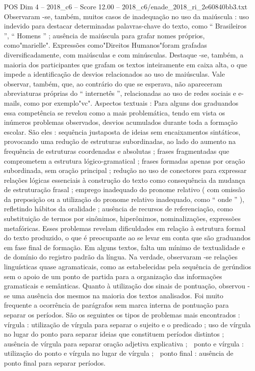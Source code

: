 \begin{textsample}{POS Dim 4 – 2018\_c6 – Score 12.00 – 2018\_c6/enade\_2018\_ri\_2e60840bb3.txt}
Observaram -se, também, muitos casos de inadequação no uso da maiúscula : uso indevido para destacar determinadas palavras-chave do texto, como “ Brasileiros ”, “ Homens ” ; ausência de maiúscula para grafar nomes próprios, como"marielle".
Expressões como"Direitos Humanos"foram grafadas diversificadamente, com maiúsculas e com minúsculas.
Destaque -se, também, a maioria dos participantes que grafam os textos inteiramente em caixa alta, o que impede a identificação de desvios relacionados ao uso de maiúsculas.
Vale observar, também, que, ao contrário do que se esperava, não apareceram abreviaturas próprias do “ internetês ”, relacionadas ao uso de redes sociais e e-mails, como por exemplo"vc".
Aspectos textuais : Para alguns dos graduandos essa competência se revelou como a mais problemática, tendo em vista os inúmeros problemas observados, desvios acumulados durante toda a formação escolar.
São eles : sequência justaposta de ideias sem encaixamentos sintáticos, provocando uma redução de estruturas subordinadas, ao lado do aumento na frequência de estruturas coordenadas e absolutas ; frases fragmentadas que comprometem a estrutura lógico-gramatical ; frases formadas apenas por oração subordinada, sem oração principal ; redução no uso de conectores para expressar relações lógicas essenciais à construção do texto como consequência da mudança de estruturação frasal ; emprego inadequado do pronome relativo ( com omissão da preposição ou a utilização do pronome relativo inadequado, como “ onde ” ), refletindo hábitos da oralidade ; ausência de recursos de referenciação, como substituição de termos por sinônimos, hiperônimos, nominalizações, expressões metafóricas.
Esses problemas revelam dificuldades em relação à estrutura formal do texto produzido, o que é preocupante ao se levar em conta que são graduandos em fase final de formação.
Em alguns textos, falta um mínimo de textualidade e de domínio do registro padrão da língua.
Na verdade, observaram -se relações linguísticas quase agramaticais, como as estabelecidas pela sequência de gerúndios sem o apoio de um ponto de partida para a organização das informações gramaticais e semânticas.
Quanto à utilização dos sinais de pontuação, observou -se uma ausência dos mesmos na maioria dos textos analisados.
Foi muito frequente a ocorrência de parágrafos sem marca interna de pontuação para separar os períodos.
São os seguintes os tipos de problemas mais encontrados :  vírgula : utilização de vírgula para separar o sujeito e o predicado ; uso de vírgula no lugar do ponto para separar ideias que constituem períodos distintos ; ausência de vírgula para separar oração adjetiva explicativa ;  ponto e vírgula : utilização do ponto e vírgula no lugar de vírgula ;  ponto final : ausência de ponto final para separar períodos.

\end{textsample}
